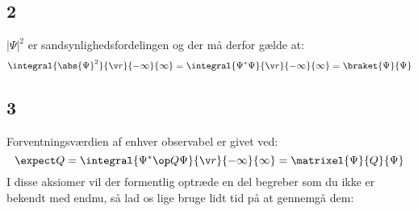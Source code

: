 \subsection*{2}
$|\Psi|^2$ er sandsynlighedsfordelingen og der må derfor gælde at:
\begin{equation}
    \integral{\abs{\Psi}^{2}}{\v r}{-\infty}{\infty}=\integral{\Psi^{*}\Psi}{\v r}{-\infty}{\infty}=\braket{\Psi}{\Psi} 
    \label{kvant:eq:norm}
\end{equation}
\subsection*{3}
Forventningsværdien af enhver observabel er givet ved:
\begin{equation}
\expect Q=\integral{\Psi^{*}\op Q\Psi}{\v r}{-\infty}{\infty} = \matrixel{\Psi}{Q}{\Psi}
\label{kvant:eq:forvent}
\end{equation}
I disse aksiomer vil der formentlig optræde en del begreber som du ikke er bekendt med endnu, så lad os lige bruge lidt tid på at gennemgå dem:
